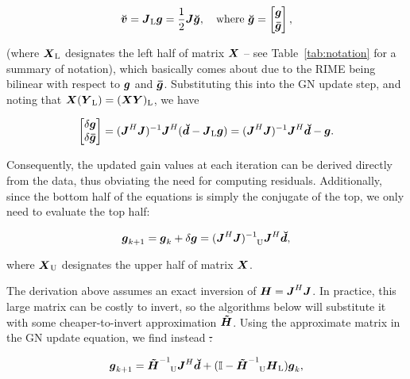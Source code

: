 \documentclass[useAMS,usenatbib]{mn2e}
\makeatletter
\newcommand{\II}{\mathbb{I}}
\newcommand{\vecg}{\bmath{g}}
\newcommand{\vecgc}{\bmath{\bar g}}
\newcommand{\mat}[1]{{\bmath{#1}}}
\newcommand{\JJ}{\mat{J}} %
\newcommand{\HH}{\mat{H}} %
\newcommand{\HHa}{\mat{\tilde{H}}} %
\newcommand{\JHJ}{\JJ^H\JJ} %
\newcommand{\Matrix}[2]{\left [ \begin{array}{@{}#1@{}}#2\end{array} \right ]}
\newcommand{\AUG}[1]{\bmath{\breve{#1}}}
\newcommand{\Gg}{\AUG{g}}
\newcommand{\Dd}{\AUG{d}}
\newcommand{\Vv}{\AUG{v}}
\newcommand{\TOP}{\mathrm{U}}%
\newcommand{\LEFT}{\mathrm{L}}
\numberwithin{equation}{section} %
\providecommand{\DIFadd}[1]{{\protect\color{blue}\uwave{#1}}} %
\providecommand{\DIFdel}[1]{{\protect\color{red}\sout{#1}}}                      %
\providecommand{\DIFaddbegin}{} %
\providecommand{\DIFaddend}{} %
\providecommand{\DIFdelbegin}{} %
\providecommand{\DIFdelend}{} %
\makeatother
\begin{document}
\DIFdelend \begin{equation}
\label{eq:v_Jg}
\Vv = \JJ_\LEFT \bmath{g}  = \frac{1}{2}\JJ \Gg,~~~\mathrm{where}~\Gg = \Matrix{c}{\bmath{g} \\ \bmath{\bar g}},
\end{equation}
\DIFdelbegin %

\DIFdelend (where $\bmath{X}_\LEFT$ designates the left half of matrix $\bmath{X}$ -- see Table~\ref{tab:notation} for a summary of notation),
which basically comes about due to the RIME being bilinear with respect to $\bmath{g}$ and $\bmath{\bar g}$. 
Substituting this into the GN update step, and noting that $\bmath{X}(\bmath{Y}_\LEFT) = (\bmath{XY})_\LEFT$, 
we have 
\DIFdelbegin %

\DIFdelend \DIFaddbegin \begin{equation}
\DIFaddend \Matrix{c}{\delta\vecg\\\delta\vecgc} = (\JHJ)^{-1} \JJ^H (\Dd - \JJ_\LEFT \vecg) = (\JHJ)^{-1} \JJ^H \Dd - \vecg.
\DIFdelbegin %
\end{equation}%

\begin{equation}%
\DIFdelend \DIFaddbegin \end{equation}
\DIFaddend Consequently, the updated gain values at each iteration can be derived directly from the data, thus obviating the need
for computing residuals. Additionally, since the bottom half of the equations is simply the conjugate of the top, 
we only need to evaluate the top half:
\DIFdelbegin %

\DIFdelend \begin{equation}
\label{eq:ghat}
\vecg_{k+1} = \vecg_k + \delta\vecg = (\JHJ)^{-1}_{~~~\TOP} \JJ^H \Dd,
\end{equation}
\DIFdelbegin %

\DIFdelend where $\bmath{X}_\TOP$ designates the upper half of matrix $\bmath{X}$. 

The derivation above assumes an exact inversion of $\HH=\JHJ$. In practice, this large matrix can be costly to invert, 
so the algorithms below will substitute it with some cheaper-to-invert approximation $\HHa$. Using the approximate
matrix in the GN update equation, we find instead \DIFdelbegin \DIFdel{:
}%

\DIFdelend \DIFaddbegin \DIFadd{that
}\DIFaddend \begin{equation}
\label{eq:ghat:approx}
\vecg_{k+1} = \HHa^{-1}_{~~~\TOP} \JJ^H \Dd + (\II - \HHa^{-1}_{~~~\TOP} \HH_\LEFT )\vecg_k,
\end{equation}
\DIFdelbegin %
\end{document}
